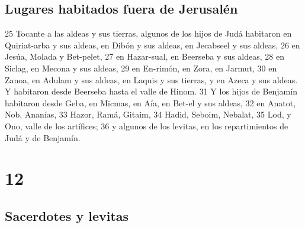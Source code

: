 \section*{Lugares habitados fuera de Jerusalén}

25 Tocante a las aldeas y sus tierras, algunos de los hijos de Judá habitaron en Quiriat-arba y sus aldeas, en Dibón y sus aldeas, en Jecabseel y sus aldeas,
26 en Jesúa, Molada y Bet-pelet,
27 en Hazar-sual, en Beerseba y sus aldeas,
28 en Siclag, en Mecona y sus aldeas,
29 en En-rimón, en Zora, en Jarmut,
30 en Zanoa, en Adulam y sus aldeas, en Laquis y sus tierras, y en Azeca y sus aldeas. Y habitaron desde Beerseba hasta el valle de Hinom.
31 Y los hijos de Benjamín habitaron desde Geba, en Micmas, en Aía, en Bet-el y sus aldeas,
32 en Anatot, Nob, Ananías,
33 Hazor, Ramá, Gitaim,
34 Hadid, Seboim, Nebalat,
35 Lod, y Ono, valle de los artífices;
36 y algunos de los levitas, en los repartimientos de Judá y de Benjamín.

\chapter{12}

\section*{Sacerdotes y levitas}


